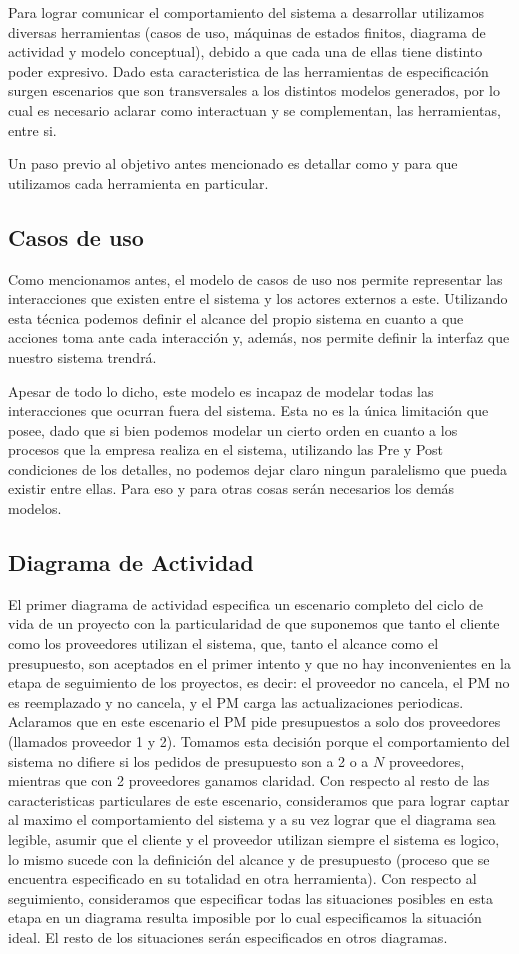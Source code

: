 Para lograr comunicar el comportamiento del sistema a desarrollar utilizamos diversas herramientas (casos de uso, máquinas de estados finitos, diagrama de actividad y modelo conceptual), debido a que cada una de ellas tiene distinto poder expresivo.
Dado esta caracteristica de las herramientas de especificación surgen escenarios que son transversales a los distintos modelos generados, por lo cual es necesario aclarar como interactuan y se complementan, las herramientas, entre si.

Un paso previo al objetivo antes mencionado es detallar como y para que utilizamos cada herramienta en particular.
\subsection{Casos de uso}
Como mencionamos antes, el modelo de casos de uso nos permite representar las interacciones que existen entre
el sistema y los actores externos a este. Utilizando esta técnica podemos definir el alcance del propio sistema
en cuanto a que acciones toma ante cada interacción y, además, nos permite definir la interfaz que nuestro
sistema trendrá.

Apesar de todo lo dicho, este modelo es incapaz de modelar todas las interacciones que ocurran fuera del sistema.
Esta no es la única limitación que posee, dado que si bien podemos modelar un cierto orden en cuanto a los procesos
que la empresa realiza en el sistema, utilizando las Pre y Post condiciones de los detalles, no podemos dejar
claro ningun paralelismo que pueda existir entre ellas. Para eso y para otras cosas serán necesarios los demás modelos.

\subsection{Diagrama de Actividad}
El primer diagrama de actividad especifica un escenario completo del ciclo de vida de un proyecto con la particularidad de que suponemos que tanto el cliente como los proveedores utilizan el sistema, que, tanto el alcance como el presupuesto, son aceptados en el primer intento y que no hay inconvenientes en la etapa de seguimiento de los proyectos, es decir: el proveedor no cancela, el PM no es reemplazado y no cancela, y el PM carga las actualizaciones periodicas. Aclaramos que en este escenario el PM pide presupuestos a solo dos proveedores (llamados proveedor 1 y 2). Tomamos esta decisión porque el comportamiento del sistema no difiere si los pedidos de presupuesto son a 2 o a $N$ proveedores, mientras que con 2 proveedores ganamos claridad. Con respecto al resto de las caracteristicas particulares de este escenario, consideramos que para lograr captar al maximo el comportamiento del sistema y a su vez lograr que el diagrama sea legible, asumir que el cliente y el proveedor utilizan siempre el sistema es logico, lo mismo sucede con la definición del alcance y de presupuesto (proceso que se encuentra especificado en su totalidad en otra herramienta). Con respecto al seguimiento, consideramos que especificar todas las situaciones posibles en esta etapa en un diagrama resulta imposible por lo cual especificamos la situación ideal. El resto de los situaciones serán especificados en otros diagramas.   

